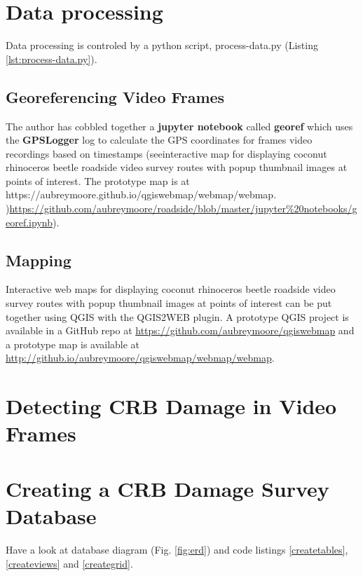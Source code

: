 \documentclass[12pt,letterpaper,english,bibliography=totocnumbered, abstract=on]{scrartcl}
\begin{document}
\section{Data processing}

Data processing is controled by a python script, process-data.py (Listing \ref{lst:process-data.py}).




\subsection{Georeferencing Video Frames}

The author has cobbled together a \textbf{jupyter notebook} called \textbf{georef} which uses the \textbf{GPSLogger} log to calculate the GPS coordinates for frames video recordings based on timestamps (seeinteractive map for displaying coconut rhinoceros beetle roadside video survey routes with popup thumbnail images at points of interest. The prototype map is at https://aubreymoore.github.io/qgiswebmap/webmap/webmap. )\url{https://github.com/aubreymoore/roadside/blob/master/jupyter%20notebooks/georef.ipynb}). 
	
\subsection{Mapping}

Interactive web maps for displaying coconut rhinoceros beetle roadside video survey routes with popup thumbnail images at points of interest can be put together using QGIS with the QGIS2WEB plugin. A prototype QGIS project is available in a GitHub repo at \url{https://github.com/aubreymoore/qgiswebmap} and a prototype map is available at \url{http://github.io/aubreymoore/qgiswebmap/webmap/webmap}.

\section{Detecting CRB Damage in Video Frames}

\section{Creating a CRB Damage Survey Database}

Have a look at database diagram (Fig. \ref{fig:erd}) and code listings \ref{createtables},  \ref{createviews} and \ref{creategrid}.
\end{document}
